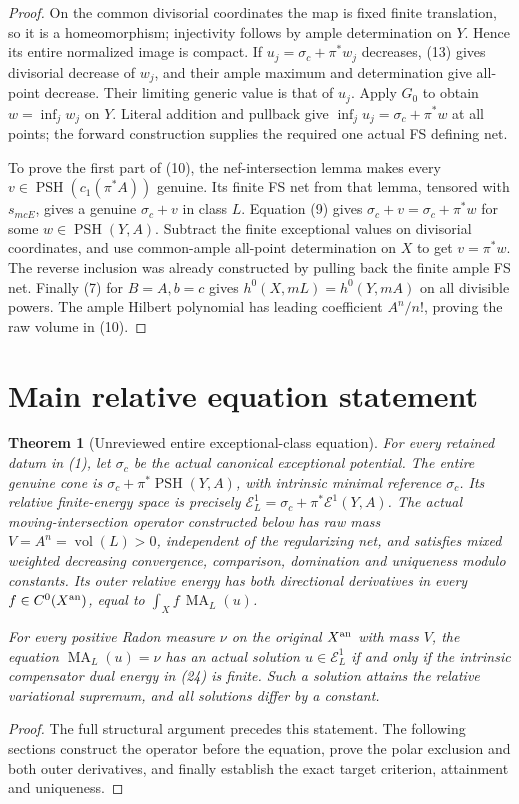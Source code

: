 \documentclass[11pt]{article}
\newcommand{\PSH}{\operatorname{PSH}}
\newcommand{\vol}{\operatorname{vol}}
\newcommand{\MA}{\operatorname{MA}}
\newtheorem{theorem}{Theorem}
\begin{document}
\begin{proof}
On the common divisorial coordinates the map is fixed finite
translation, so it is a homeomorphism; injectivity follows by
ample determination on $Y$. Hence its entire normalized image is
compact. If $u_j=\sigma_c+\pi^*w_j$ decreases, (13) gives
divisorial decrease of $w_j$, and their ample maximum and
determination give all-point decrease. Their limiting generic
value is that of $u_j$. Apply $G_0$ to obtain
$w=\inf_j w_j$ on $Y$. Literal addition and pullback give
$\inf_j u_j=\sigma_c+\pi^*w$ at all points; the forward
construction supplies the required one actual FS defining net.

To prove the first part of (10), the nef-intersection lemma makes
every $v\in\PSH(c_1(\pi^*A))$ genuine. Its finite FS net from
that lemma, tensored with $s_{mcE}$, gives a genuine
$\sigma_c+v$ in class $L$. Equation (9) gives
$\sigma_c+v=\sigma_c+\pi^*w$ for some $w\in\PSH(Y,A)$.
Subtract the finite exceptional values on divisorial coordinates,
and use common-ample all-point determination on $X$ to get
$v=\pi^*w$. The reverse inclusion was already constructed by
pulling back the finite ample FS net. Finally (7) for $B=A,b=c$
gives $h^0(X,mL)=h^0(Y,mA)$ on all divisible powers. The ample
Hilbert polynomial has leading coefficient $A^n/n!$, proving
the raw volume in (10).
\end{proof}


\section{Main relative equation statement}
\begin{theorem}[Unreviewed entire exceptional-class equation]
For every retained datum in (1), let $\sigma_c$ be the actual
canonical exceptional potential. The entire genuine cone is
$\sigma_c+\pi^*\PSH(Y,A)$, with intrinsic minimal reference
$\sigma_c$. Its relative finite-energy space is precisely
$\mathcal E_L^1=\sigma_c+\pi^*\mathcal E^1(Y,A)$.
The actual moving-intersection operator constructed below has raw
mass $V=A^n=\vol(L)>0$, independent of the regularizing net, and
satisfies mixed weighted decreasing convergence, comparison,
domination and uniqueness modulo constants. Its outer relative
energy has both directional derivatives in every
$f\in C^0(X^{\rm an})$, equal to $\int_X f\,\MA_L(u)$.

For every positive Radon measure $\nu$ on the original $X^{\rm an}$
with mass $V$, the equation $\MA_L(u)=\nu$ has an actual solution
$u\in\mathcal E_L^1$ if and only if the intrinsic compensator
dual energy in (24) is finite. Such a solution attains the relative
variational supremum, and all solutions differ by a constant.
\end{theorem}
\begin{proof}
The full structural argument precedes this statement. The following
sections construct the operator before the equation, prove the
polar exclusion and both outer derivatives, and finally establish
the exact target criterion, attainment and uniqueness.
\end{proof}
\end{document}
